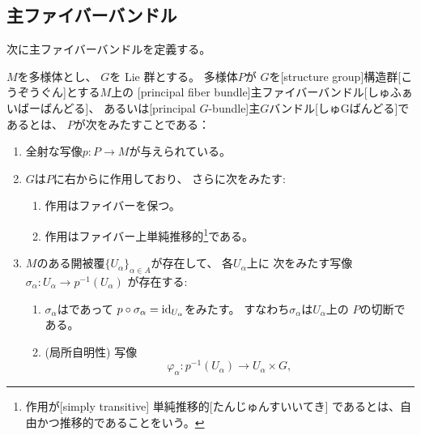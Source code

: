 \documentclass[report]{jlreq}
\begin{document}
%
\subsection{主ファイバーバンドル}

次に主ファイバーバンドルを定義する。

\begin{definition}[主ファイバーバンドル]
    $M$を多様体とし、
    $G$を Lie 群とする。
    多様体$P$が
    $G$を[structure group]{構造群}[こうぞうぐん]とする$M$上の
    [principal fiber bundle]{主ファイバーバンドル}[しゅふぁいばーばんどる]、
    あるいは[principal $G$-bundle]{主$G$バンドル}[しゅGばんどる]であるとは、
    $P$が次をみたすことである：
    \begin{enumerate}
        \item 全射な{\smooth}写像$p \colon P \to M$が与えられている。
        \item $G$は$P$に右から{\smooth}に作用しており、
            さらに次をみたす:
            \begin{enumerate}[label=(\arabic{enumi}-\alph*)]
                \item 作用はファイバーを保つ。
                \item 作用はファイバー上単純推移的\footnote{
                        作用が[simply transitive]
                        {単純推移的}[たんじゅんすいいてき]
                        であるとは、自由かつ推移的であることをいう。
                    }である。
            \end{enumerate}
        \item $M$のある開被覆$\{ U_\alpha \}_{\alpha \in A}$が存在して、
            各$U_\alpha$上に
            次をみたす写像
            $\sigma_\alpha \colon U_\alpha \to p^{-1}(U_\alpha)$
            が存在する:
            \begin{enumerate}[label=(\arabic{enumi}-\alph*)]
                \item $\sigma_\alpha$は{\smooth}であって
                    $p \circ \sigma_\alpha = \mathrm{id}_{U_\alpha}$をみたす。
                    すなわち$\sigma_\alpha$は$U_\alpha$上の
                    $P$の切断である。
                \item (局所自明性) 写像
                    \begin{equation}
                        \varphi_\alpha \colon p^{-1}(U_\alpha) \to U_\alpha \times G,

\end{equation}
\end{enumerate}
\end{enumerate}
\end{definition}
\end{document}
